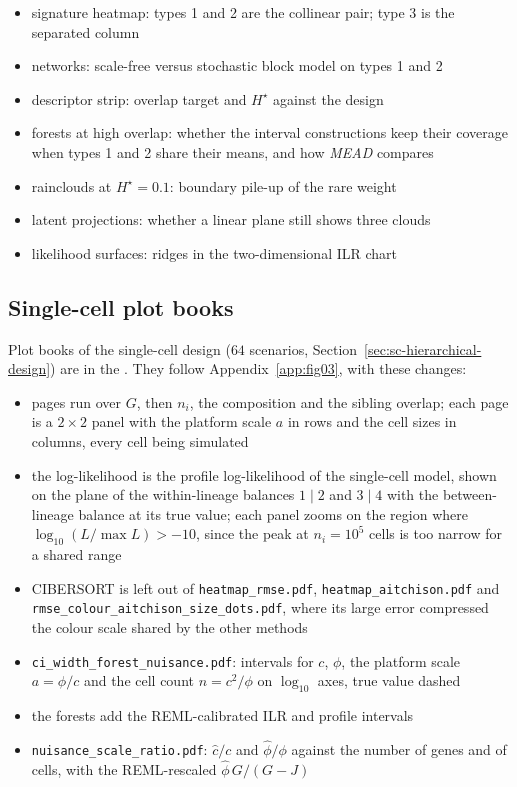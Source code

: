 \begin{itemize}
  \item signature heatmap: types 1 and 2 are the collinear pair; type 3 is the separated column
  \item networks: scale-free versus stochastic block model on types 1 and 2
  \item descriptor strip: overlap target and \(H^{\star}\) against the design
  \item forests at high overlap: whether the interval constructions keep their coverage when types 1 and 2 share
        their means, and how \emph{MEAD} compares
  \item rainclouds at \(H^{\star}=0.1\): boundary pile-up of the rare weight
  \item latent projections: whether a linear plane still shows three clouds
  \item likelihood surfaces: ridges in the two-dimensional ILR chart
\end{itemize}

\subsection{Single-cell plot books}
\label{app:fig06}

Plot books of the single-cell design (\(64\) scenarios, Section~\ref{sec:sc-hierarchical-design}) are in the
. They follow Appendix~\ref{app:fig03}, with these changes:
\begin{itemize}
  \item pages run over \(G\), then \(n_{i}\), the composition and the sibling overlap; each page is a \(2\times2\)
        panel with the platform scale \(a\) in rows and the cell sizes in columns, every cell being simulated
  \item the log-likelihood is the profile log-likelihood of the single-cell model, shown on the plane of the
        within-lineage balances \(1\mid2\) and \(3\mid4\) with the between-lineage balance at its true value; each
        panel zooms on the region where \(\log_{10}(L/\max L)>-10\), since the peak at \(n_{i}=10^{5}\) cells is too
        narrow for a shared range
  \item CIBERSORT is left out of \texttt{heatmap\_rmse.pdf}, \texttt{heatmap\_aitchison.pdf} and
        \texttt{rmse\_colour\_aitchison\_size\_dots.pdf}, where its large error compressed the colour scale shared
        by the other methods
  \item \texttt{ci\_width\_forest\_nuisance.pdf}: intervals for \(c\), \(\phi\), the platform scale \(a=\phi/c\)
        and the cell count \(n=c^{2}/\phi\) on \(\log_{10}\) axes, true value dashed
  \item the forests add the REML-calibrated ILR and profile intervals
  \item \texttt{nuisance\_scale\_ratio.pdf}: \(\hat c/c\) and \(\hat\phi/\phi\) against the number of genes and of cells,
        with the REML-rescaled \(\hat\phi\,G/(G-J)\)
\end{itemize}

